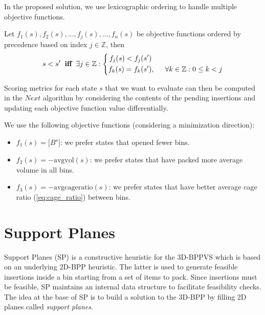 
In the proposed solution, we use lexicographic ordering to handle multiple objective functions.
\begin{definition}
    \label{def:lexicographic_ordering}
    Let $f_1(s), f_2(s), \dots, f_j(s), \dots, f_n(s)$ be objective functions ordered by precedence based on index $j \in \mathbb{Z}$, then 
    \begin{equation*}
        s < s^\prime \hspace{.2cm} \textbf{iff} \hspace{.2cm} \exists j \in \mathbb{Z} : \left\{
            \begin{aligned}
                f_j(s) < f_j(s^\prime) & \\
                f_k(s) = f_k(s^\prime) &,\hspace{.5cm} \forall k \in \mathbb{Z} : 0 \le k < j 
            \end{aligned}
        \right.
    \end{equation*}
\end{definition}

Scoring metrics for each state $s$ that we want to evaluate can then be computed in the $Next$ algorithm by considering the contents of the pending insertions and updating each objective function value differentially.

We use the following objective functions (considering a minimization direction):
\begin{itemize}
    \item $f_1(s) = |B^s|$: we prefer states that opened fewer bins.
    \item $f_2(s) = -\text{avgvol}(s)$: we prefer states that have packed more average volume in all bins.
    \item $f_3(s) = -\text{avgcageratio}(s)$: we prefer states that have better average cage ratio (\cref{eq:cage_ratio}) between bins.
\end{itemize}

\section{Support Planes}
\label{sec:support_planes}%
Support Planes (SP) is a constructive heuristic for the 3D-BPPVS which is based on an underlying 2D-BPP heuristic. The latter is used to generate feasible insertions inside a bin starting from a set of items to pack.
Since insertions must be feasible, SP maintains an internal data structure to facilitate feasibility checks.
The idea at the base of SP is to build a solution to the 3D-BPP by filling 2D planes called \textit{support planes}.

